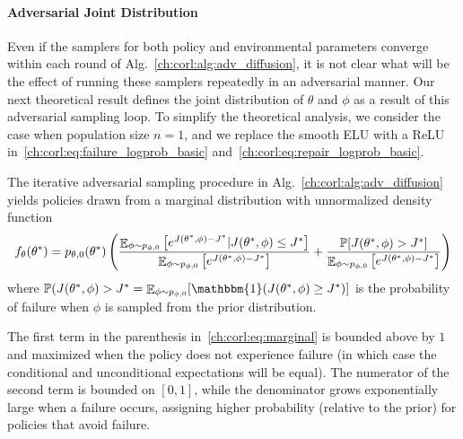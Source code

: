 \paragraph{Adversarial Joint Distribution} Even if the samplers for both policy and environmental parameters converge within each round of Alg.~\ref{ch:corl:alg:adv_diffusion}, it is not clear what will be the effect of running these samplers repeatedly in an adversarial manner. Our next theoretical result defines the joint distribution of $\theta$ and $\phi$ as a result of this adversarial sampling loop. To simplify the theoretical analysis, we consider the case when population size $n=1$, and we replace the smooth ELU with a ReLU in~\eqref{ch:corl:eq:failure_logprob_basic} and~\eqref{ch:corl:eq:repair_logprob_basic}.

\begin{theorem}\label{ch:corl:thm:joint}
    The iterative adversarial sampling procedure in Alg.~\ref{ch:corl:alg:adv_diffusion} yields policies drawn from a marginal distribution with unnormalized density function
    \begin{equation}
        f_\theta(\theta^*) = p_{\theta, 0}(\theta^*) \left( \frac{\mathop{\mathbb{E}}_{\phi \sim p_{\phi, 0}}\left[ e^{J(\theta^*, \phi) - J^*} | J(\theta^*, \phi) \leq J^* \right]}{\mathop{\mathbb{E}}_{\phi \sim p_{\phi, 0}}\left[ e^{J(\theta^*, \phi) - J^*} \right]} +
            \frac{\mathbb{P}[J(\theta^*, \phi) > J^*]}{\mathop{\mathbb{E}}_{\phi \sim p_{\phi, 0}}\left[ e^{J(\theta^*, \phi) - J^*}\right]} \right)\label{ch:corl:eq:marginal}
    \end{equation}
    where $\mathbb{P}(J(\theta^*, \phi) > J^* = \expectation_{\phi \sim p_{\phi, 0}}[\mathbbm{1}(J(\theta^*, \phi) \geq J^*)]$ is the probability of failure when $\phi$ is sampled from the prior distribution.
\end{theorem}

The first term in the parenthesis in~\eqref{ch:corl:eq:marginal} is bounded above by $1$ and maximized when the policy does not experience failure (in which case the conditional and unconditional expectations will be equal). The numerator of the second term is bounded on $[0, 1]$, while the denominator grows exponentially large when a failure occurs, assigning higher probability (relative to the prior) for policies that avoid failure.

